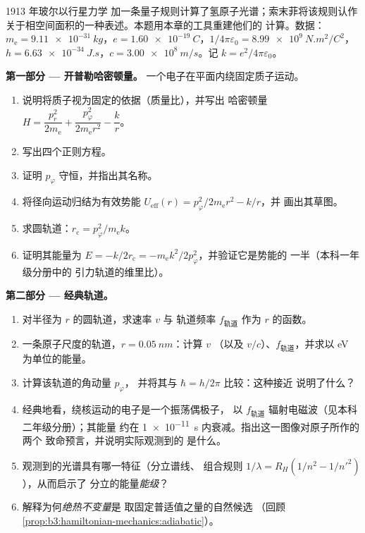 \begin{problem}\label{pb:b3:hamiltonian-mechanics:1}
1913 年玻尔以行星力学
加一条量子规则计算了氢原子光谱；索末菲将该规则认作
关于相空间面积的一种表述。本题用本章的工具重建他们的
计算。数据：$m_{\text{e}} =
\qty{9.11e-31}{kg}$，$e = \qty{1.60e-19}{C}$，$1/4\pi\varepsilon_0 =
\qty{8.99e9}{N.m^2/C^2}$，$h = \qty{6.63e-34}{J.s}$，$c =
\qty{3.00e8}{m/s}$。记 $k = e^2/4\pi\varepsilon_0$。

\medskip\noindent\textbf{第一部分 --- 开普勒哈密顿量。}
一个电子在平面内绕固定质子运动。
\begin{enumerate}
  \item 说明将质子视为固定的依据（质量比），并写出
        哈密顿量 $H = \dfrac{p_r^2}{2m_{\text{e}}} +
        \dfrac{p_\varphi^2}{2m_{\text{e}}r^2} - \dfrac{k}{r}$。
  \item 写出四个正则方程。
  \item 证明 $p_\varphi$ 守恒，并指出其名称。
  \item 将径向运动归结为有效势能
        $U_{\text{eff}}(r) = p_\varphi^2/2m_{\text{e}}r^2 - k/r$，并
        画出其草图。
  \item 求圆轨道：$r_{\text{c}} =
        p_\varphi^2/m_{\text{e}}k$。
  \item 证明其能量为 $E = -k/2r_{\text{c}} =
        -m_{\text{e}}k^2/2p_\varphi^2$，并验证它是势能的
        一半（本科一年级分册中的
        引力轨道的维里比）。
\end{enumerate}

\medskip\noindent\textbf{第二部分 --- 经典轨道。}
\begin{enumerate}[resume]
  \item 对半径为 $r$ 的圆轨道，求速率 $v$ 与
        轨道频率 $f_{\text{轨道}}$ 作为 $r$ 的函数。
  \item 一条原子尺度的轨道，$r = \qty{0.05}{nm}$：计算 $v$
        （以及 $v/c$）、$f_{\text{轨道}}$，并求以 eV 为单位的能量。
  \item 计算该轨道的角动量 $p_\varphi$，
        并将其与 $\hbar = h/2\pi$ 比较：这种接近
        说明了什么？
  \item 经典地看，绕核运动的电子是一个振荡偶极子，
        以 $f_{\text{轨道}}$ 辐射电磁波（见本科二年级分册）；其能量
        约在 \qty{1e-11}{s} 内衰减。指出这一图像对原子所作的两个
        致命预言，并说明实际观测到的
        是什么。
  \item 观测到的光谱具有哪一特征（分立谱线、
        组合规则 $1/\lambda = R_H(1/n^2 - 1/n'^2)$），从而启示了
        分立的能量\emph{能级}？
  \item 解释为何\emph{绝热不变量}是
        取固定普适值之量的自然候选
        （回顾\cref{prop:b3:hamiltonian-mechanics:adiabatic}）。
\end{enumerate}


\end{problem}

